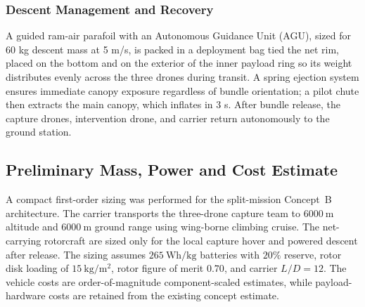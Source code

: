 \subsubsection{Descent Management and Recovery}
A guided ram-air parafoil with an Autonomous Guidance Unit (AGU), sized for 60 kg descent mass at 5 m/s, is packed in a deployment bag tied the net rim, placed on the bottom and on the exterior of the inner payload ring so its weight distributes evenly across the three drones during transit. A spring ejection system ensures immediate canopy exposure regardless of bundle orientation; a pilot chute then extracts the main canopy, which inflates in 3 s. After bundle release, the capture drones, intervention drone, and carrier return autonomously to the ground station.



\subsection{Preliminary Mass, Power and Cost Estimate}

A compact first-order sizing was performed for the split-mission Concept~B architecture. The carrier transports the three-drone capture team to $6000~\mathrm{m}$ altitude and $6000~\mathrm{m}$ ground range using wing-borne climbing cruise. The net-carrying rotorcraft are sized only for the local capture hover and powered descent after release. The sizing assumes $265~\mathrm{Wh/kg}$ batteries with $20\%$ reserve, rotor disk loading of $15~\mathrm{kg/m^2}$, rotor figure of merit $0.70$, and carrier $L/D=12$. The vehicle costs are order-of-magnitude component-scaled estimates, while payload-hardware costs are retained from the existing concept estimate.

